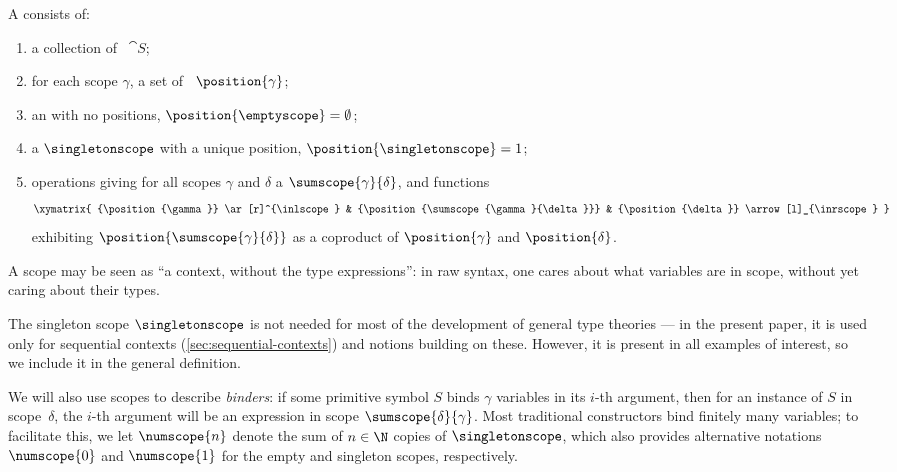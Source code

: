 \begin{definition}
  \label{def:scope-system}
  A  consists of:
  \begin{enumerate}
  \item a collection of ~$\cat{S}$;
  \item for each scope $\gamma$, a set of ~$\position{\gamma}$;
  \item an  with no positions, $\position{\emptyscope} = \emptyset$;
  \item a  $\singletonscope$ with a unique position, $\position{\singletonscope} = 1$;
  \item operations giving for all scopes $\gamma$ and $\delta$ a  $\sumscope{\gamma}{\delta}$, and functions
    \begin{equation*}
      \xymatrix{
        {\position{\gamma}} \ar[r]^{\inlscope} &
        {\position{\sumscope{\gamma}{\delta}}} &
        {\position{\delta}} \arrow[l]_{\inrscope}
      }
    \end{equation*}
    exhibiting $\position{\sumscope{\gamma}{\delta}}$ as a coproduct of
    $\position{\gamma}$ and $\position{\delta}$.
  \end{enumerate}
\end{definition}

\noindent
%
A scope may be seen as “a context, without the type expressions”: in raw syntax, one cares about what variables are in scope, without yet caring about their types.

The singleton scope $\singletonscope$ is not needed for most of the development of general type theories --- in the present paper, it is used only for sequential contexts (\cref{sec:sequential-contexts}) and notions building on these.
%
However, it is present in all examples of interest, so we include it in the general definition.

We will also use scopes to describe \emph{binders}:
%
if some primitive symbol $S$ binds $\gamma$ variables in its $i$-th argument, then for an instance of $S$ in scope~$\delta$, the $i$-th argument will be an expression in scope $\sumscope{\delta}{\gamma}$.
%
Most traditional constructors bind finitely many variables; to facilitate this, we let $\numscope{n}$ denote the sum of $n \in \N$ copies of $\singletonscope$, which also provides alternative notations $\numscope{0}$ and $\numscope{1}$ for the empty and singleton scopes, respectively.

